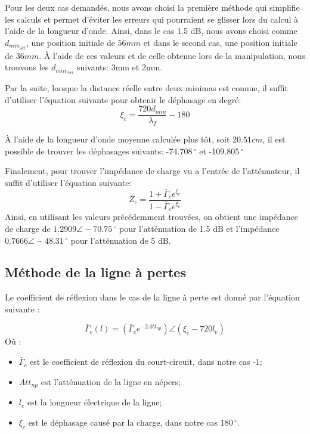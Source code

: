 Pour les deux cas demandés, nous avons choisi la première méthode qui simplifie les calculs et permet d'éviter les erreurs qui pourraient se glisser lors du calcul à l'aide de la longueur d'onde. Ainsi, dans le cas 1.5 dB, nous avons choisi comme $d_{min_{\#2}}$, une position initiale de $56mm$ et dans le second cas, une position initiale de $36mm$. À l'aide de ces valeurs et de celle obtenue lors de la manipulation, nous trouvons les $d_{min_{reel}}$ suivants: 3mm et 2mm.

Par la suite, lorsque la distance réelle entre deux minimas est connue, il suffit d'utiliser l'équation suivante pour obtenir le déphasage en degré:
\begin{equation}
\label{eq:11}
    \xi_c = \frac{720d_{min}}{\lambda_f}-180
\end{equation}

À l'aide de la longueur d'onde moyenne calculée plus tôt, soit $20.51cm$, il est possible de trouver les déphasages suivants: -74.708$\,^{\circ}$ et -109.805$\,^{\circ}$

Finalement, pour trouver l'impédance de charge vu a l'entrée de l'atténuateur, il suffit d'utiliser l'équation suivante:
\begin{equation}
\label{eq:eq6}
    \bar{Z}_c = \frac{1+\bar{\Gamma}_c e^{\xi_c}}{1-\bar{\Gamma}_c e^{\xi_c}}
\end{equation}
Ainsi, en utilisant les valeurs précédemment trouvées, on obtient une impédance de charge de $1.2909 \angle -70.75\,^{\circ}$ pour l'atténuation de 1.5 dB et l'impédance $0.7666 \angle -48.31\,^{\circ}$ pour l'atténuation de 5 dB.

\subsection{Méthode de la ligne à pertes}
Le coefficient de réflexion dans le cas de la ligne à perte est donné par l'équation suivante :

\begin{equation}
\label{eq:eq5}
     \bar{\Gamma}_c(l) =  (\bar{\Gamma}_c e^{-2Att_{np}}) \angle (\xi_c - 720l_e)
\end{equation}
Où :
\begin{itemize}
    \item $\bar{\Gamma}_c$ est le coefficient de réflexion du court-circuit, dans notre cas -1;
    \item $Att_{np}$ est l'atténuation de la ligne en népers;
    \item $l_e$ est la longueur électrique de la ligne;
    \item $\xi_c$ est le déphasage causé par la charge, dans notre cas $180\,^{\circ}$.
\end{itemize}

